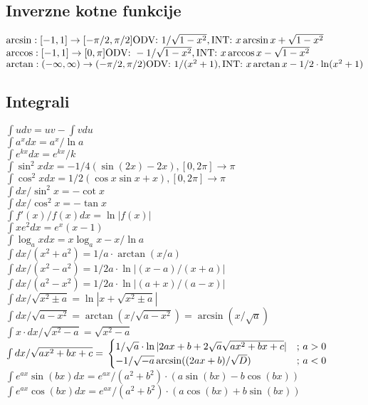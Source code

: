 \documentclass{formule}
\begin{document}
\subsection*{Inverzne kotne funkcije}
\(\arcsin : [-1, 1] \to [- \pi / 2, \pi / 2] \\ \text{ODV: } 1 / \sqrt{1 - x^2}, \text{INT: } x \arcsin x + \sqrt{1 - x^2}\) \\
\(\arccos : [-1, 1] \to [0, \pi] \\ \text{ODV: } -1 / \sqrt{1 - x^2}, \text{INT: } x \arccos x - \sqrt{1 - x^2}\) \\
\(\arctan : (- \infty, \infty) \to (- \pi / 2, \pi / 2) \\ \text{ODV: } 1 / (x^2 + 1), \text{INT: } x \arctan x - 1/2 \cdot \ln (x^2 + 1)\)

\subsection*{Integrali}
\(\int u dv = uv - \int v du\) \\
\(\int a^x dx = a^x / \ln a\) \\
\(\int e^{kx} dx = e^{kx} / k\) \\
\(\int \sin^2 x dx = - 1 / 4 (\sin (2x) - 2x), [0, 2 \pi] \to \pi\) \\
\(\int \cos^2 x dx = 1 / 2 (\cos x \sin x + x), [0, 2 \pi] \to \pi \)\\
\(\int dx / \sin^2 x = - \cot x\) \\
\(\int dx / \cos^2 x = - \tan x\) \\
\(\int f'(x) / f(x) dx = \ln | f(x) |\) \\
\(\int x e^2 dx = e^x (x- 1)\) \\
\(\int \log_a x dx = x \log_a x - x / \ln a\) \\
\(\int dx / (x^2 + a^2) = 1/a \cdot \arctan (x/a)\) \\
\(\int dx / (x^2 - a^2) = 1/2a \cdot \ln | (x - a) / (x + a) |\) \\
\(\int dx / (a^2 - x^2) = 1/2a \cdot \ln | (a + x) / (a - x) |\) \\
\(\int dx / \sqrt{x^2 \pm a} = \ln | x + \sqrt{x^2 \pm a} |\) \\
\( \int dx / \sqrt{a - x^2} = \arctan (x / \sqrt{a - x^2}) = \arcsin (x / \sqrt{a}) \) \\
\(\int x \cdot dx / \sqrt{x^2 - a} = \sqrt{x^2 - a} \) \\
\(\int dx / \sqrt{a x^2 + bx + c} = \\
\begin{cases}
    1 / \sqrt{a} \cdot \ln | 2ax + b + 2 \sqrt{a} \sqrt{ax^2 + bx + c} | & \text{; } a > 0 \\
    - 1 / \sqrt{- a} \arcsin ((2ax + b) / \sqrt{D}) & \text{; } a < 0
\end{cases}\)
\(\int e^{ax} \sin (bx) dx = e^{ax} / (a^2 + b^2) \cdot (a \sin (bx) - b \cos (bx))\) \\
\(\int e^{ax} \cos (bx) dx = e^{ax} / (a^2 + b^2) \cdot (a \cos (bx) + b \sin (bx))\)
\end{document}

